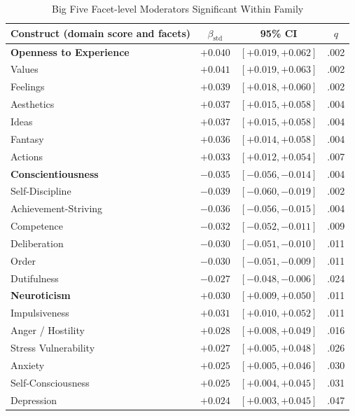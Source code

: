 \documentclass[11pt,a4paper]{article}
\newcommand{\floatleft}{\setlength{\parindent}{0pt}\RaggedRight}
\begin{document}
\begin{table}[H]
\floatleft
\caption{Big Five Facet-level Moderators Significant Within Family}
\label{tab:facets}
\vspace{2pt}
\begingroup\small
\begin{tabularx}{\linewidth}{@{}Yccc@{}}
\toprule
Construct (domain score and facets) & $\beta_{\text{std}}$ & 95\% CI & $q$ \\
\midrule
\textbf{Openness to Experience} & $+0.040$ & $[+0.019, +0.062]$ & .002 \\
\quad Values & $+0.041$ & $[+0.019, +0.063]$ & .002 \\
\quad Feelings & $+0.039$ & $[+0.018, +0.060]$ & .002 \\
\quad Aesthetics & $+0.037$ & $[+0.015, +0.058]$ & .004 \\
\quad Ideas & $+0.037$ & $[+0.015, +0.058]$ & .004 \\
\quad Fantasy & $+0.036$ & $[+0.014, +0.058]$ & .004 \\
\quad Actions & $+0.033$ & $[+0.012, +0.054]$ & .007 \\
\addlinespace
\textbf{Conscientiousness} & $-0.035$ & $[-0.056, -0.014]$ & .004 \\
\quad Self-Discipline & $-0.039$ & $[-0.060, -0.019]$ & .002 \\
\quad Achievement-Striving & $-0.036$ & $[-0.056, -0.015]$ & .004 \\
\quad Competence & $-0.032$ & $[-0.052, -0.011]$ & .009 \\
\quad Deliberation & $-0.030$ & $[-0.051, -0.010]$ & .011 \\
\quad Order & $-0.030$ & $[-0.051, -0.009]$ & .011 \\
\quad Dutifulness & $-0.027$ & $[-0.048, -0.006]$ & .024 \\
\addlinespace
\textbf{Neuroticism} & $+0.030$ & $[+0.009, +0.050]$ & .011 \\
\quad Impulsiveness & $+0.031$ & $[+0.010, +0.052]$ & .011 \\
\quad Anger / Hostility & $+0.028$ & $[+0.008, +0.049]$ & .016 \\
\quad Stress Vulnerability & $+0.027$ & $[+0.005, +0.048]$ & .026 \\
\quad Anxiety & $+0.025$ & $[+0.005, +0.046]$ & .030 \\
\quad Self-Consciousness & $+0.025$ & $[+0.004, +0.045]$ & .031 \\
\quad Depression & $+0.024$ & $[+0.003, +0.045]$ & .047 \\

\end{tabularx}
\end{table}
\end{document}
